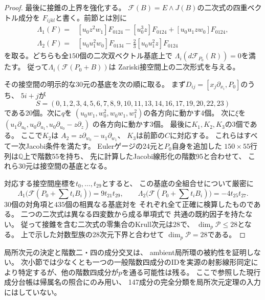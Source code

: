 \begin{proof}
最後に接錐の上界を強化する。
$\mathcal F(B)=E\wedge J(B)$の二次式の四重ベクトル成分を
$F_{ijkl}$と書く。前節とは別に
\[
 \begin{split}
 \Lambda_1(F)={}&[u_0z^2w_1]F_{0124}
       -[u_0^3z]F_{0124}
       +[u_0u_1zw_0]F_{0124},\\
 \Lambda_2(F)={}&[u_0u_1^2w_0]F_{0134}
       -\frac23[u_0u_1^2z]F_{0124}
 \end{split}
\]
を取る。どちらも全$150$個の二次双ベクトル基底上で
$\Lambda_i(d\mathcal F_{P_0}(R))=0$を満たす。
従って$\Lambda_i(\mathcal F(P_0+B))$は
Zariski接空間上の二次形式を与える。

その接空間の明示的な30元の基底を次の順に取る。
まず$D_{ij}=[x_j\partial_{x_i},P_0]$のうち、
$5i+j$が
\[
 S=(0,1,2,3,4,5,6,7,8,9,10,11,13,14,16,17,19,20,22,23)
\]
である20個。次に$q$を
$(u_0w_1,w_0^2,w_0w_1,w_1^2)$の各方向に動かす4個。
次に$\xi$を
$(u_1\partial_{u_0},u_0\partial_{u_1},
  u_0\partial_{u_0}-z\partial_z)$
の各方向に動かす3個。
最後に$K_1,K_2,K_3$の3個である。
ここで$K_2$は
$A_2=z\partial_{w_0}-u_1\partial_{w_1}$、
$K_3$は前節の$C$に対応する。
これらはすべて一次Jacobi条件を満たす。
Eulerゲージの24元と$P_0$自身を追加した
$150\times55$行列は$\mathbb Q$上で階数55を持ち、
先に計算したJacobi線形化の階数95と合わせて、
これら30元は接空間の基底となる。

対応する接空間座標を$t_0,\ldots,t_{29}$とすると、
この基底の全組合せについて厳密に
\begin{equation}\label{eq:isotropic-two-tangent-quadrics}
 \boxed{\quad
 \Lambda_1\bigl(\mathcal F(P_0+\textstyle\sum t_iB_i)\bigr)
      =9t_{21}t_{29},\qquad
 \Lambda_2\bigl(\mathcal F(P_0+\textstyle\sum t_iB_i)\bigr)
      =-4t_{25}t_{27}.\quad}
\end{equation}
$30$個の対角項と$435$個の相異なる基底対を
それぞれ全て正確に検算したものである。
二つの二次式は異なる四変数から成る単項式で
共通の既約因子を持たない。
従って接錐を含む二次式の零集合のKrull次元は$28$で、
$\dim_p\mathcal P\le28$となる。
上で示した対数型族の28次元下界と合わせて
$\dim_p\mathcal P=28$である。
\end{proof}

\begin{remark}[成分の帰属とscheme構造]
局所次元の決定と階数二・四の成分交叉は、
ambient局所環の被約性を証明しない。
次小節では少なくとも一つの一般階数四成分のIDを実源の射影線形同定により特定するが、他の階数四成分が$p$を通る可能性は残る。
ここで参照した現行成分台帳は帰属名の照合にのみ用い、
147成分の完全分類を局所次元定理の入力にはしていない。
\end{remark}


